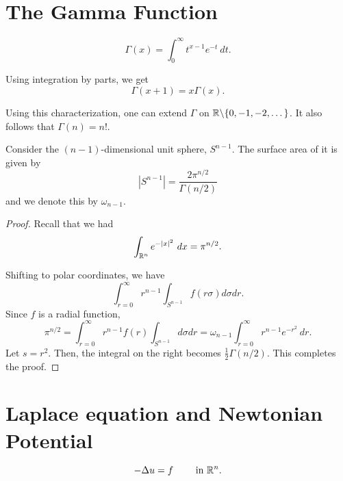 \section*{The Gamma Function}

\begin{equation*}
    \Gamma(x) = \int_{0}^\infty t^{x - 1}e^{-t}~dt.
\end{equation*}

Using integration by parts, we get 
\begin{equation*}
    \Gamma(x + 1) = x\Gamma(x).
\end{equation*}

Using this characterization, one can extend $\Gamma$ on $\mathbb{R}\backslash\{0, -1, -2,\dots\}$. It also follows that $\Gamma(n) = n!$.

\begin{theorem}
    Consider the $(n - 1)$-dimensional unit sphere, $S^{n - 1}$. The surface area of it is given by 
    \begin{equation*}
        |S^{n - 1}| = \frac{2\pi^{n/2}}{\Gamma(n/2)}
    \end{equation*}
    and we denote this by $\omega_{n - 1}$.
\end{theorem}
\begin{proof}
    Recall that we had 
    \begin{equation*}
        \int_{\mathbb{R}^n}e^{-|x|^2}~dx = \pi^{n/2}.
    \end{equation*}

    Shifting to polar coordinates, we have 
    \begin{equation*}
        \int_{r = 0}^\infty r^{n - 1}\int_{S^{n - 1}}f(r\sigma)d\sigma dr.
    \end{equation*}
    Since $f$ is a radial function, 
    \begin{equation*}
        \pi^{n/2} = \int_{r = 0}^\infty r^{n - 1}f(r)\int_{S^{n - 1}}d\sigma dr = \omega_{n - 1}\int_{r = 0}^\infty r^{n - 1}e^{-r^2}~dr.
    \end{equation*}
    Let $s = r^2$. Then, the integral on the right becomes $\frac{1}{2}\Gamma(n/2)$. This completes the proof.
\end{proof}

\section*{Laplace equation and Newtonian Potential}

\begin{equation*}
    -\Delta u = f \qquad\text{ in } \mathbb{R}^n.
\end{equation*}

